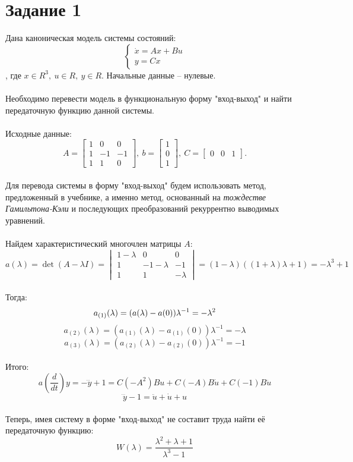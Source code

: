 \documentclass[12pt]{article}
\begin{document}
\section*{Задание 1}
Дана каноническая модель системы состояний:
\[
\begin{cases}
    \dot{x}=Ax+Bu\\
    y=Cx
\end{cases}
\]
, где $x \in R^3,\ u \in R,\ y \in R$. Начальные данные -- нулевые. \\
\ \\
Необходимо перевести модель в функциональную форму "вход-выход" и найти передаточную функцию данной системы.\\
\ \\
Исходные данные:
\[
A=\begin{bmatrix}
1 & 0 & 0\\
1 & -1 & -1\\
1 & 1 & 0
\end{bmatrix},\
b=\begin{bmatrix}
    1\\
    0\\
    1
\end{bmatrix},\
C = \begin{bmatrix}
    0 & 0 & 1
\end{bmatrix}.
\] \\
Для перевода системы в форму "вход-выход" будем использовать метод, предложенный в учебнике, а именно метод, основанный на \emph{тождестве Гамильтона-Кэли} и последующих преобразований рекуррентно выводимых уравнений.\\
\ \\
Найдем характеристический многочлен матрицы $A$:
\[
a(\lambda) = \det(A - \lambda I) = \begin{vmatrix}
    1 - \lambda & 0 & 0\\
    1 & -1 - \lambda & -1\\
    1 & 1 & -\lambda
\end{vmatrix} = (1 - \lambda)((1 + \lambda)\lambda + 1) = - \lambda^3 + 1
\] \\
Тогда:
\[
a_{(1)}(\lambda) = (a(\lambda) - a(0))\lambda^{-1} = -\lambda^2\\
\]
\[
a_{(2)}(\lambda) = (a_{(1)}(\lambda) - a_{(1)}(0))\lambda^{-1} = -\lambda
\]
\[
a_{(3)}(\lambda) = (a_{(2)}(\lambda) - a_{(2)}(0))\lambda^{-1} = -1
\] \\
Итого:
\[
a(\frac{d}{dt})y = -\dddot{y} + 1 = C(-A^2)Bu + C(-A)B\dot{u} + C(-1)B\ddot{u}
\]
\[
\dddot{y} - 1 = \ddot{u} + \dot{u} + u
\] \\
Теперь, имея систему в форме "вход-выход" не составит труда найти её передаточную функцию:
\[
W(\lambda) = \frac{\lambda^2 + \lambda + 1}{\lambda^3 - 1}
\]
\end{document}

